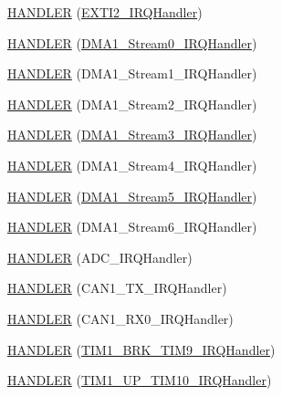 \begin{DoxyCompactItemize}
\item 
\hyperlink{group___p_i_o_s_ga8f4231146f11b7ec2b7cfe4789a1afa3}{H\-A\-N\-D\-L\-E\-R} (\hyperlink{group___p_i_o_s___e_x_t_i_gab5a1d9e9c8ef50e0cb9ddb5745a20a14}{E\-X\-T\-I2\-\_\-\-I\-R\-Q\-Handler})
\item 
\hyperlink{group___p_i_o_s_ga13fe24463da7f0ad3f1c1967d5f85514}{H\-A\-N\-D\-L\-E\-R} (\hyperlink{group___tau_labs_core_ga1b70a4441662b1d6548e803499da414f}{D\-M\-A1\-\_\-\-Stream0\-\_\-\-I\-R\-Q\-Handler})
\item 
\hyperlink{group___p_i_o_s_ga56c01029b55ddc924fed289f14797c89}{H\-A\-N\-D\-L\-E\-R} (D\-M\-A1\-\_\-\-Stream1\-\_\-\-I\-R\-Q\-Handler)
\item 
\hyperlink{group___p_i_o_s_ga951ef6b9669d7229cc20eb36c4ed6d76}{H\-A\-N\-D\-L\-E\-R} (D\-M\-A1\-\_\-\-Stream2\-\_\-\-I\-R\-Q\-Handler)
\item 
\hyperlink{group___p_i_o_s_ga5a835df41056ec1fe998c5b2df30f8b1}{H\-A\-N\-D\-L\-E\-R} (\hyperlink{group___tau_labs_core_ga51d485393cf37043623c8bd0abae12a1}{D\-M\-A1\-\_\-\-Stream3\-\_\-\-I\-R\-Q\-Handler})
\item 
\hyperlink{group___p_i_o_s_gae2ae9fe1b7fbbac27ceaf8c085255ea7}{H\-A\-N\-D\-L\-E\-R} (D\-M\-A1\-\_\-\-Stream4\-\_\-\-I\-R\-Q\-Handler)
\item 
\hyperlink{group___p_i_o_s_ga91d06149cb05850dc812b4a3f8fcdf6f}{H\-A\-N\-D\-L\-E\-R} (\hyperlink{group___w_a_v_e_p_l_a_y_e_r___private___variables_gac201b60d58b0eba2ce0b55710eb3c4d0}{D\-M\-A1\-\_\-\-Stream5\-\_\-\-I\-R\-Q\-Handler})
\item 
\hyperlink{group___p_i_o_s_gaa0728c2b9fc9dc457309d801d78e95bd}{H\-A\-N\-D\-L\-E\-R} (D\-M\-A1\-\_\-\-Stream6\-\_\-\-I\-R\-Q\-Handler)
\item 
\hyperlink{group___p_i_o_s_gaeaae2b77eadbeae6679c9c80abe4af1e}{H\-A\-N\-D\-L\-E\-R} (A\-D\-C\-\_\-\-I\-R\-Q\-Handler)
\item 
\hyperlink{group___p_i_o_s_gaeea8d0e1d22529cde3b6e3257c391136}{H\-A\-N\-D\-L\-E\-R} (C\-A\-N1\-\_\-\-T\-X\-\_\-\-I\-R\-Q\-Handler)
\item 
\hyperlink{group___p_i_o_s_ga7453b7196fb31ff23a32f771aef37a4e}{H\-A\-N\-D\-L\-E\-R} (C\-A\-N1\-\_\-\-R\-X0\-\_\-\-I\-R\-Q\-Handler)
\item 
\hyperlink{group___p_i_o_s_gad650c0d1f4898574c29120ac55a2546f}{H\-A\-N\-D\-L\-E\-R} (\hyperlink{group___p_i_o_s___t_i_m_ga3b60f6118cdd3449f4ed29fde4704236}{T\-I\-M1\-\_\-\-B\-R\-K\-\_\-\-T\-I\-M9\-\_\-\-I\-R\-Q\-Handler})
\item 
\hyperlink{group___p_i_o_s_gaae58b36fbe035659376ee656ebdcab07}{H\-A\-N\-D\-L\-E\-R} (\hyperlink{group___p_i_o_s___t_i_m_gad1fd361bc5ad89facee67c76d1ff8dc0}{T\-I\-M1\-\_\-\-U\-P\-\_\-\-T\-I\-M10\-\_\-\-I\-R\-Q\-Handler})

\end{DoxyCompactItemize}
